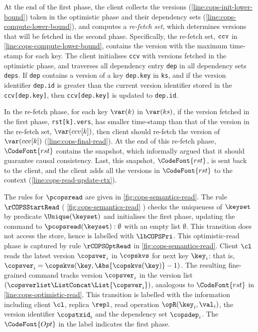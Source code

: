 At the end of the first phase, 
the client collects the versions (\cref{line:cops-init-lower-bound}) taken in the optimistic phase
and their dependency sets (\cref{line:cops-compute-lower-bound}),
and computes a \emph{re-fetch set}, which determines versions that will be fetched in the second phase.
Specifically, the re-fetch set, \( \verb|ccv| \) in \cref{line:cops-compute-lower-bound}, contains the version with the maximum time-stamp for each key.
The client initialises \verb|ccv| with versions fetched in the optimistic phase,
and traverses all dependency entry \verb|dep| in all dependency sets \verb|deps|.
If \verb|dep| contains a version of a key \verb|dep.key| in \verb|ks|,
and if the version identifier \verb|dep.id| is greater than the current version identifier stored in the \verb|ccv[dep.key]|,
then \verb|ccv[dep.key]| is updated to \verb|dep.id|.

In the re-fetch phase, for each key \( \var(k) \) in \( \var(ks) \), 
if the version fetched in the first phase, \verb|rst[k].vers|,
has smaller time-stamp than that of the version in the re-fetch set, \( \var(ccv[k]) \),
then client should re-fetch the version of \( \var(ccv[k]) \) (\cref{line:cops-final-read}).
At the end of this re-fetch phase, \( \CodeFont{rst} \) contains the snapshot, which
\citet{cops} informally argued that it should guarantee causal consistency.
Last, this snapshot, \( \CodeFont{rst} \), is sent back to the client, and 
the client adds all the versions in \( \CodeFont{rst} \) to the context (\cref{line:cops-read-update-ctx}).



The rules for \( \pcopsread \) are given in \cref{fig:cops-semantics-read}.
The rule \( \rCOPSStartRead \) ( \cref{fig:cops-semantics-read} ) 
checks the uniqueness of \( \keyset \) by predicate \( \Unique(\keyset) \) and
initialises the first phase, updating the command to 
\( \pcopsread( \keyset ) : \emptyset \) with an empty list \( \emptyset \).
This transition does not access the store, hence is labelled with \( \lbCOPSPri \).
This optimistic-read phase is captured by rule \( \rCOPSOptRead \) in \cref{fig:cops-semantics-read}.
Client \( \cl \) reads the latest version \( \copsver_i \) in \( \copskvs \) for next key \( \key_i \):
that is, \( \copsver_i = \copskvs(\key, \Abs{\copskvs(\key)} - 1) \).
The resulting fine-grained command tracks version \( \copsver_i \) in the version list \( (\copsverlist \ListConcat \List{\copsver_i}) \),
analogous to \( \CodeFont{rst} \) in \cref{line:cops-optimistic-read}.
This transition is labelled with the information including client \( \cl \),
replica \( \repl \), read operation \( \opR(\key_i,\val_i) \), the version identifier \(\copstxid_i\) and the dependency set \(\copsdep_i\).
The \( \CodeFont{Opt} \) in the label indicates the first phase.

